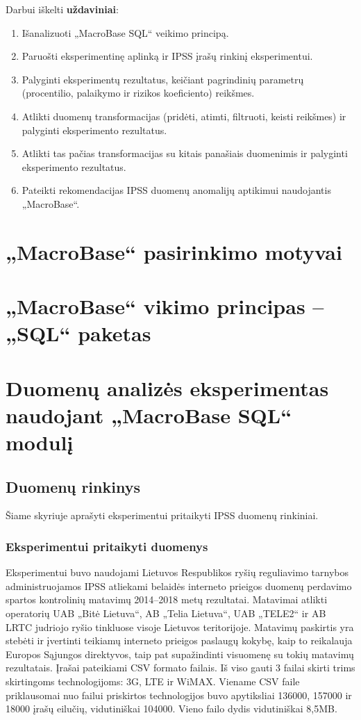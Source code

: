 \documentclass{VUMIFPSbakalaurinis}
\begin{document}
Darbui iškelti \textbf{uždaviniai}:
\begin{enumerate}
	\item Išanalizuoti „MacroBase SQL“ veikimo principą.
	\item Paruošti eksperimentinę aplinką ir IPSS įrašų rinkinį eksperimentui.
	\item Palyginti eksperimentų rezultatus, keičiant pagrindinių parametrų (procentilio, palaikymo ir rizikos koeficiento) reikšmes.
	\item Atlikti duomenų transformacijas (pridėti, atimti, filtruoti, keisti reikšmes) ir palyginti eksperimento rezultatus.
	\item Atlikti tas pačias transformacijas su kitais panašiais duomenimis ir palyginti eksperimento rezultatus. 
	\item Pateikti rekomendacijas IPSS duomenų anomalijų aptikimui naudojantis „MacroBase“.
\end{enumerate}

\section{„MacroBase“ pasirinkimo motyvai}

\section{„MacroBase“ vikimo principas – „SQL“ paketas}

\section{Duomenų analizės eksperimentas naudojant „MacroBase SQL“ modulį}

\subsection{Duomenų rinkinys}
Šiame skyriuje aprašyti eksperimentui pritaikyti IPSS duomenų rinkiniai.

\subsubsection{Eksperimentui pritaikyti duomenys}
Eksperimentui buvo naudojami Lietuvos Respublikos ryšių reguliavimo tarnybos administruojamos IPSS atliekami belaidės interneto prieigos duomenų perdavimo spartos kontrolinių matavimų 2014–2018 metų rezultatai. Matavimai atlikti operatorių UAB „Bitė Lietuva“, AB „Telia Lietuva“, UAB „TELE2“ ir AB LRTC judriojo ryšio tinkluose visoje Lietuvos teritorijoje. Matavimų paskirtis yra stebėti ir įvertinti teikiamų interneto prieigos paslaugų kokybę, kaip to reikalauja Europos Sąjungos direktyvos, taip pat supažindinti visuomenę su tokių matavimų rezultatais. Įrašai pateikiami CSV formato failais. Iš viso gauti 3 failai skirti trims skirtingoms technologijoms: 3G, LTE ir WiMAX. Viename CSV faile priklausomai nuo failui priskirtos technologijos buvo apytiksliai 136000, 157000 ir 18000 įrašų eilučių, vidutiniškai 104000. Vieno failo dydis vidutiniškai 8,5MB.
\end{document}
